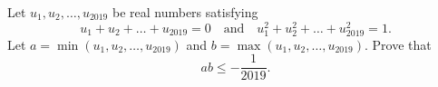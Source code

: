 Let $u_1,u_2,\dots,u_{2019}$ be real numbers satisfying
\[
	u_1+u_2+\dots+u_{2019}=0\quad\text{and}\quad u_1^2+u_2^2+\dots+u_{2019}^2=1.
\]
Let $a=\min(u_1,u_2,\dots,u_{2019})$ and $b=\max(u_1,u_2,\dots,u_{2019})$. Prove that
\[
	ab\leq-\frac{1}{2019}.
\]
